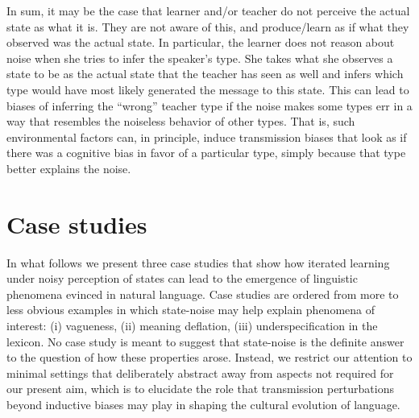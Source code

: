 \documentclass[10pt,a4paper]{article}
\newcommand{\citeposs}[2][]{\citeauthor{#2}'s (\citeyear[#1]{#2})}
\begin{document}
In sum, it may be the case that learner and/or teacher do not perceive the actual state as what
it is. They are not aware of this, and produce/learn as if what they observed was the actual
state. In particular, the learner does not reason about noise when she tries to infer the
speaker's type. She takes what she observes a state to be as the actual state that the teacher
has seen as well and infers which type would have most likely generated the message to this
state. This can lead to biases of inferring the ``wrong'' teacher type if the noise makes some
types err in a way that resembles the noiseless behavior of other types. That is, such
environmental factors can, in principle, induce transmission biases that look as if there was a
cognitive bias in favor of a particular type, simply because that type better explains the
noise.


\section{Case studies}

In what follows we present three case studies that show how iterated learning under noisy
perception of states can lead to the emergence of linguistic phenomena evinced in natural
language. Case studies are ordered from more to less obvious examples in which state-noise may
help explain phenomena of interest: (i) vagueness, (ii) meaning deflation, (iii)
underspecification in the lexicon.
No case study is meant to suggest that state-noise is the definite answer to the question of
how these properties arose. Instead, we restrict our attention to minimal settings that
deliberately abstract away from aspects not required for our present aim, which is to elucidate
the role that transmission perturbations beyond inductive biases may play in shaping the
cultural evolution of language.
\end{document}
